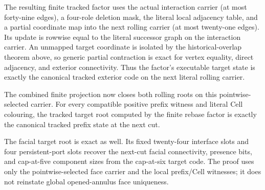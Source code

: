 The resulting finite tracked factor uses the actual interaction carrier
(at most forty-nine edges), a four-role deletion mask, the literal local
adjacency table, and a partial coordinate map into the next rolling carrier
(at most twenty-one edges).  Its update is rowwise equal to the literal
successor graph on the interaction carrier.  An unmapped target coordinate is
isolated by the historical-overlap theorem above, so generic partial
contraction is exact for vertex equality, direct adjacency, and exterior
connectivity.  Thus the factor's executable target state is exactly the
canonical tracked exterior code on the next literal rolling carrier.

The combined finite projection now closes both rolling roots on this
pointwise-selected carrier.  For every compatible positive prefix witness and
literal Cell colouring, the tracked target root computed by the finite rebase
factor is exactly the canonical tracked prefix state at the next cut.


The facial target root is exact as well.  Its fixed twenty-four interface
slots and four persistent-port slots recover the next-cut facial connectivity,
presence bits, and cap-at-five component sizes from the cap-at-six target
code.  The proof uses only the pointwise-selected face carrier and the local
prefix/Cell witnesses; it does not reinstate global opened-annulus face
uniqueness.


